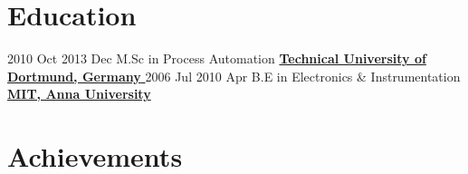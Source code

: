 \documentclass[letterpaper]{DS_class_file} %
\begin{document}
\newpage

\makeseconda %

\section{Education}

\begin{twenty} %

   	\twentyitem
	    {2010 Oct}
	    {2013 Dec}
	    {\hspace{0.2cm}M.Sc in Process Automation}
	    {\href{https://www.tu-dortmund.de/en/}{\hspace{0.27cm} \textbf{Technical University of Dortmund, Germany} }}
	    {}
	    {}
        \twentyitem
	    {2006 Jul}
	    {2010 Apr}
	    {\hspace{0.2cm}B.E in Electronics \& Instrumentation}
	    {\href{https://mitindia.edu/}{\hspace{0.27cm} \textbf{MIT, Anna University} }}
	    {}
	    {} 
\end{twenty}

\section{Achievements}
\end{document}
